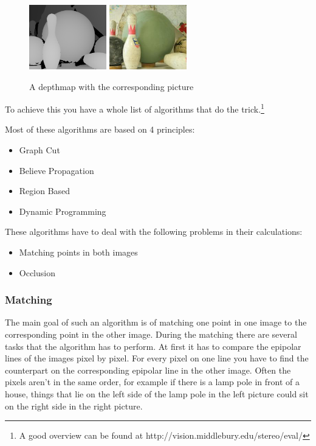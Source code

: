 \documentclass[a4paper]{article}
\begin{document}
\begin{figure}
\centering
\includegraphics[width=0.3\textwidth]{depthmap}
\includegraphics[width=0.3\textwidth]{depthmap_original}
\caption{A depthmap with the corresponding picture}
\end{figure}

To achieve this you have a whole list of algorithms that do
the trick.\footnote{A good overview can be found at
http://vision.middlebury.edu/stereo/eval/}

Most of these algorithms are based on 4 principles: 

\begin{itemize}
\item Graph Cut
\item Believe Propagation
\item Region Based
\item Dynamic Programming
\end{itemize}

These algorithms have to deal with the following problems in their
calculations:

\begin{itemize}
    \item Matching points in both images
    \item Occlusion
\end{itemize}

\subsubsection{Matching}
The main goal of such an algorithm is of matching one
point in one image to the corresponding point in the other image. During the
matching there are several tasks that the algorithm has to perform. At
first it has to compare the epipolar lines of the images pixel by
pixel. For every pixel on one line you have to find the counterpart on
the corresponding epipolar line in the other image. Often the pixels aren't
in the same order, for example if
there is a lamp pole in front of a house, things that lie on
the left side of the lamp pole in the left picture could sit on the right
side in the right picture.
\end{document}
